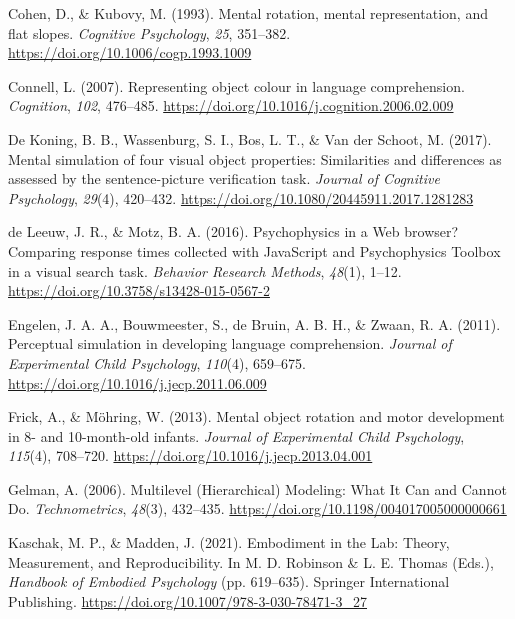\documentclass[
  man,floatsintext]{apa7}
\newlength{\cslhangindent}
\newlength{\cslentryspacingunit} %
\newenvironment{CSLReferences}[2] %
 {%
  \setlength{\parindent}{0pt}
  \ifodd #1
  \let\oldpar\par
  \def\par{\hangindent=\cslhangindent\oldpar}
  \fi
  \setlength{\parskip}{#2\cslentryspacingunit}
 }%
 {}
\begin{document}
\begin{CSLReferences}{1}{0}
\leavevmode{}%
Cohen, D., \& Kubovy, M. (1993). Mental rotation, mental representation, and flat slopes. \emph{Cognitive Psychology}, \emph{25}, 351--382. \url{https://doi.org/10.1006/cogp.1993.1009}

\leavevmode{}%
Connell, L. (2007). Representing object colour in language comprehension. \emph{Cognition}, \emph{102}, 476--485. \url{https://doi.org/10.1016/j.cognition.2006.02.009}

\leavevmode{}%
De Koning, B. B., Wassenburg, S. I., Bos, L. T., \& Van der Schoot, M. (2017). Mental simulation of four visual object properties: Similarities and differences as assessed by the sentence-picture verification task. \emph{Journal of Cognitive Psychology}, \emph{29}(4), 420--432. \url{https://doi.org/10.1080/20445911.2017.1281283}

\leavevmode{}%
de Leeuw, J. R., \& Motz, B. A. (2016). Psychophysics in a {Web} browser? {Comparing} response times collected with {JavaScript} and {Psychophysics Toolbox} in a visual search task. \emph{Behavior Research Methods}, \emph{48}(1), 1--12. \url{https://doi.org/10.3758/s13428-015-0567-2}

\leavevmode{}%
Engelen, J. A. A., Bouwmeester, S., de Bruin, A. B. H., \& Zwaan, R. A. (2011). Perceptual simulation in developing language comprehension. \emph{Journal of Experimental Child Psychology}, \emph{110}(4), 659--675. \url{https://doi.org/10.1016/j.jecp.2011.06.009}

\leavevmode{}%
Frick, A., \& Möhring, W. (2013). Mental object rotation and motor development in 8- and 10-month-old infants. \emph{Journal of Experimental Child Psychology}, \emph{115}(4), 708--720. \url{https://doi.org/10.1016/j.jecp.2013.04.001}

\leavevmode{}%
Gelman, A. (2006). Multilevel ({Hierarchical}) {Modeling}: {What} {It} {Can} and {Cannot} {Do}. \emph{Technometrics}, \emph{48}(3), 432--435. \url{https://doi.org/10.1198/004017005000000661}

\leavevmode{}%
Kaschak, M. P., \& Madden, J. (2021). Embodiment in the {Lab}: {Theory}, {Measurement}, and {Reproducibility}. In M. D. Robinson \& L. E. Thomas (Eds.), \emph{Handbook of {Embodied Psychology}} (pp. 619--635). {Springer International Publishing}. \url{https://doi.org/10.1007/978-3-030-78471-3_27}


\end{CSLReferences}
\end{document}
